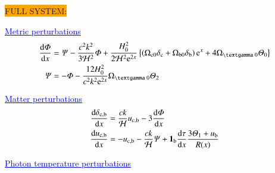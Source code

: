\please

\noindent\colorbox{orange}{FULL SYSTEM:}
\par \textcolor{blue}{\underline{Metric perturbations}}
\begin{subequations}\label{mil3:theo:eq:metric_perturbations}
\begin{align}
    \dv{\Phi}{x} &= \Psi - \frac{c^2 k^2}{3\Hp^2} \Phi + \frac{H_0^2}{2\Hp^2\eu[2x]}\left\{ \left(\Omega\ped{c 0}\delta\ped{c} + \Omega\ped{b 0}\delta\ped{b} \right)\eu[x]+4\Omega\gped{\textgamma 0}\Theta_0\right\} \\
    \Psi &= - \Phi - \frac{12H_0^2}{c^2k^2\eu^{2x}} \Omega\gped{\textgamma 0}\Theta_2 
\end{align}
\end{subequations}

\par \textcolor{blue}{\underline{Matter perturbations}}
\begin{subequations}\label{mil3:theo:eq:matter_perturbations}
\begin{align}
    \dv{\delta\ensuremath{_\mathrm{c, b}}}{x} &=  \frac{ck}{\mathcal{H}} u_\mathrm{c, b} - 3\dv{\ensuremath{\varPhi}}{x}  \\
    \dv{u\ensuremath{_\mathrm{c, b}}}{x} &= - u_\mathrm{c, b} - \frac{ck}{\mathcal{H}}\varPsi + \mathbf{1}_\mathrm{b} \dv{\tau}{x} \frac{3\varTheta_1 +u_\mathrm{b}}{R(x)} 
\end{align}
\end{subequations}

\par \textcolor{blue}{\underline{Photon temperature perturbations}}


